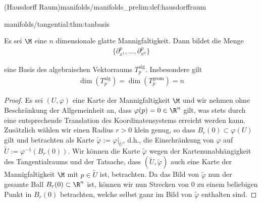 \documentclass[letterpaper,10pt,english]{jupyterBook}
\begin{document}
\begin{definition}{(Hausdorff Raum)}{manifolds/manifolds_prelim:def:hausdorffraum}
\begin{theorem}{}{manifolds/tangential:thm:tanbasis}
\par
Es sei \(\M\) eine \(n\) dimensionale glatte Mannigfaltigkeit.
Dann bildet die Menge
\begin{align*}
\{\partial_{x^1}^p,\ldots,\partial_{x^n}^p\}
\end{align*}
\par
eine Basis des algebraischen Vektorraums \(T^{\text{alg}}_p\).
Insbesondere gilt
\begin{align*}
\dim(T^{\text{alg}}_p)=\dim(T^{\text{geom}}_p)=n
\end{align*}\end{theorem}

\begin{proof}
 Es sei \((U,\varphi)\) eine Karte der Mannigfaltigkeit \(\M\) und wir nehmen ohne Beschränkung der Allgemeinheit an, dass \(\varphi(p)=0 \in \R^n\) gilt, was stets durch eine entsprechende Translation des Koordinatensystems erreicht werden kann.
Zusätzlich wählen wir einen Radius \(r>0\) klein genug, so dass \(B_r(0) \subset \varphi(U)\) gilt und betrachten als Karte \(\tilde{\varphi} := \varphi\rvert_{\tilde{U}}\), d.h., die Einschränkung von \(\varphi\) auf \(\tilde{U}:= \varphi^{-1}(B_r(0))\).
Wir können die Karte \(\tilde{\varphi}\) wegen der Kartenunabhängigkeit des Tangentialraums und der Tatsache, dass \((\tilde{U},\tilde{\varphi})\) auch eine Karte der Mannigfaltigkeit \(\M\) mit \(p\in \tilde{U}\) ist, betrachten.
Da das Bild von \(\tilde{\varphi}\) nun der gesamte Ball \(B_r(0) \subset \R^n\) ist, können wir nun Strecken von \(0\) zu einem beliebigen Punkt in \(B_r(0)\) betrachten, welche selbst ganz im Bild von \(\tilde{\varphi}\) enthalten sind.


\end{proof}
\end{definition}
\end{document}
